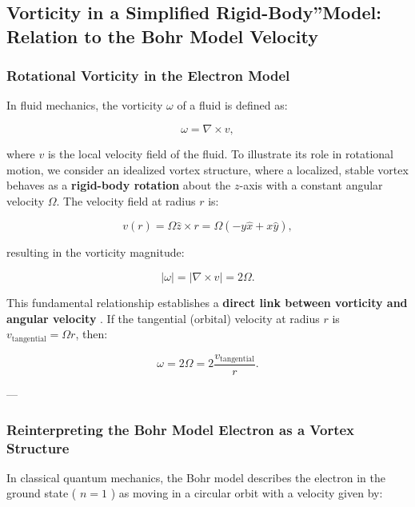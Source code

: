 \documentclass[a4paper,10pt]{article}
\begin{document}
    

\subsection{Vorticity in a Simplified \grqq Rigid-Body\textquotedblright Model: Relation to the Bohr Model Velocity}

\subsubsection*{Rotational Vorticity in the Electron Model}

In fluid mechanics, the vorticity \( \omega \) of a fluid is defined as:

\begin{equation*}
    \omega = \nabla \times v,
\end{equation*}

where \( v \) is the local velocity field of the fluid. To illustrate its role in rotational motion, we consider an idealized vortex structure, where a localized, stable vortex behaves as a \textbf{rigid-body rotation} about the \( z \)-axis with a constant angular velocity \( \Omega \). The velocity field at radius \( r \) is:

\begin{equation*}
    v(r) = \Omega \hat{z} \times r = \Omega(-y\hat{x} + x\hat{y}),
\end{equation*}

resulting in the vorticity magnitude:

\begin{equation*}
    |\omega| = |\nabla \times v| = 2\Omega.
\end{equation*}

This fundamental relationship establishes a \textbf{direct link between vorticity and angular velocity} \cite{lamb_hydrodynamics, feynman_qed}. If the tangential (orbital) velocity at radius \( r \) is \( v_\text{tangential} = \Omega r \), then:

\begin{equation*}
    \omega = 2\Omega = 2\frac{v_\text{tangential}}{r}.
\end{equation*}

---

\subsubsection*{Reinterpreting the Bohr Model Electron as a Vortex Structure}

In classical quantum mechanics, the Bohr model describes the electron in the ground state ( \( n = 1 \) ) as moving in a circular orbit with a velocity given by:
\end{document}
